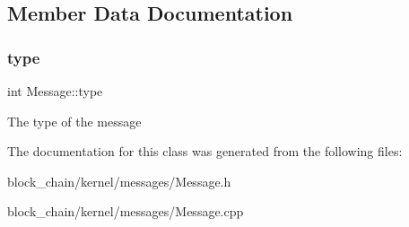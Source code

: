 \subsection{Member Data Documentation}
\mbox{\label{classMessage_afbfb481c98b13d0deba0bac443bebe29}} 
\subsubsection{\texorpdfstring{type}{type}}
{\footnotesize\ttfamily int Message\+::type\hspace{0.3cm}{\ttfamily [protected]}}

The type of the message 

The documentation for this class was generated from the following files\+:\begin{DoxyCompactItemize}
\item 
block\+\_\+chain/kernel/messages/Message.\+h\item 
block\+\_\+chain/kernel/messages/Message.\+cpp\end{DoxyCompactItemize}

